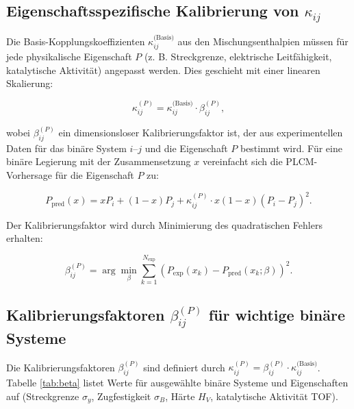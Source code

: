 \documentclass[12pt,a4paper]{article}
\begin{document}
\subsection{Eigenschaftsspezifische Kalibrierung von \(\kappa_{ij}\)}
\label{subsec:property-calibration}

Die Basis-Kopplungskoeffizienten \(\kappa_{ij}^{\text{(Basis)}}\) aus den Mischungsenthalpien müssen für jede physikalische Eigenschaft \(P\) (z. B. Streckgrenze, elektrische Leitfähigkeit, katalytische Aktivität) angepasst werden. Dies geschieht mit einer linearen Skalierung:

\begin{equation}
	\kappa_{ij}^{(P)} = \kappa_{ij}^{\text{(Basis)}} \cdot \beta_{ij}^{(P)},
	\label{eq:kappa-calibration}
\end{equation}

wobei \(\beta_{ij}^{(P)}\) ein dimensionsloser Kalibrierungsfaktor ist, der aus experimentellen Daten für das binäre System \(i\)–\(j\) und die Eigenschaft \(P\) bestimmt wird. Für eine binäre Legierung mit der Zusammensetzung \(x\) vereinfacht sich die PLCM-Vorhersage für die Eigenschaft \(P\) zu:

\begin{equation}
	P_{\text{pred}}(x) = x P_i + (1-x) P_j + \kappa_{ij}^{(P)} \cdot x(1-x) (P_i - P_j)^2.
	\label{eq:binary-prediction}
\end{equation}

Der Kalibrierungsfaktor wird durch Minimierung des quadratischen Fehlers erhalten:

\begin{equation}
	\beta_{ij}^{(P)} = \arg\min_{\beta} \sum_{k=1}^{N_{\text{exp}}} \left( P_{\text{exp}}(x_k) - P_{\text{pred}}(x_k;\beta) \right)^2.
	\label{eq:beta-optimization}
\end{equation}

\subsection{Kalibrierungsfaktoren \(\beta_{ij}^{(P)}\) für wichtige binäre Systeme}
\label{subsec:beta-table}

Die Kalibrierungsfaktoren \(\beta_{ij}^{(P)}\) sind definiert durch \(\kappa_{ij}^{(P)} = \beta_{ij}^{(P)} \cdot \kappa_{ij}^{\text{(Basis)}}\). Tabelle \ref{tab:beta} listet Werte für ausgewählte binäre Systeme und Eigenschaften auf (Streckgrenze \(\sigma_y\), Zugfestigkeit \(\sigma_B\), Härte \(H_V\), katalytische Aktivität TOF).
\end{document}
